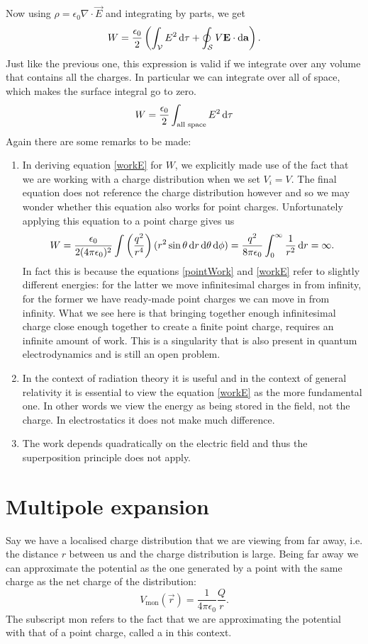 Now using $\rho = \epsilon_0 \nabla \cdot \vec{E}$ and integrating by parts, we get
\[ W = \frac{\epsilon_0}{2}\left(\int_\mathcal{V}E^2 \operatorname{d \!}{\tau} + \oint_\mathcal{S} V\bm{\mathrm{E}}\cdot \operatorname{d \!}{\bm{\mathrm{a}}}\right). \]
Just like the previous one, this expression is valid if we integrate over any volume that contains all the charges. In particular we can integrate over all of space, which makes the surface integral go to zero.
\begin{equation}
W = \frac{\epsilon_0}{2}\int_{\text{all space}}E^2 \operatorname{d \!}{\tau}
\label{workE}
\end{equation}
Again there are some remarks to be made:
\begin{enumerate}
\item In deriving equation \eqref{workE} for $W$, we explicitly made use of the fact that we are working with a charge distribution when we set $V_i = V$. The final equation does not reference the charge distribution however and so we may wonder whether this equation also works for point charges. Unfortunately applying this equation to a point charge gives us
\[ W = \frac{\epsilon_0}{2(4\pi\epsilon_0)^2}\int \left(\frac{q^2}{r^4}\right)(r^2\sin\theta \operatorname{d \!}{r}\operatorname{d \!}{\theta}\operatorname{d \!}{\phi}) = \frac{q^2}{8\pi\epsilon_0}\int^\infty_0 \frac{1}{r^2}\operatorname{d \!}{r} = \infty. \]
In fact this is because the equations \eqref{pointWork} and \eqref{workE} refer to slightly different energies: for the latter we move infinitesimal charges in from infinity, for the former we have ready-made point charges we can move in from infinity. What we see here is that bringing together enough infinitesimal charge close enough together to create a finite point charge, requires an infinite amount of work. This is a singularity that is also present in quantum electrodynamics and is still an open problem.
\item In the context of radiation theory it is useful and in the context of general relativity it is essential to view the equation \eqref{workE} as the more fundamental one. In other words we view the energy as being stored in the field, not the charge. In electrostatics it does not make much difference.
\item The work depends quadratically on the electric field and thus the superposition principle does not apply.  
\end{enumerate}

\section{Multipole expansion}
Say we have a localised charge distribution that we are viewing from far away, i.e. the distance $r$ between us and the charge distribution is large. Being far away we can approximate the potential as the one generated by a point with the same charge as the net charge of the distribution: 
\[ V_\text{mon}(\vec{r}) = \frac{1}{4\pi \epsilon_0}\frac{Q}{r}. \]
The subscript mon refers to the fact that we are approximating the potential with that of a point charge, called a  in this context.

